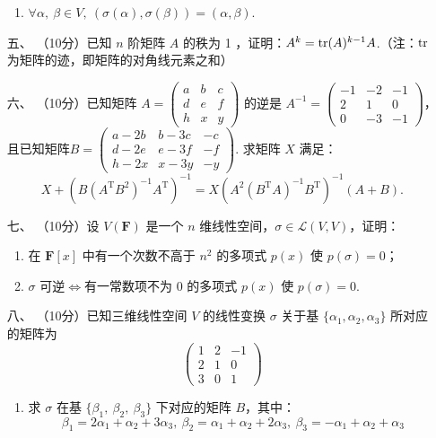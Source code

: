 \begin{enumerate}
\begin{enumerate}
        \item $\forall \alpha,\ \beta \in V,\ \left(\sigma (\alpha),\sigma (\beta) \right)=\left(\alpha,\beta\right)$.
    \end{enumerate}
	\item[五、]（10分）已知 $n$ 阶矩阵 $A$ 的秩为 1 ，证明：$A^k=\textup{tr}(A)^{k-1}A$.（注：$\textup{tr}$ 为矩阵的迹，即矩阵的对角线元素之和）
	\item[六、] （10分）已知矩阵 $A=\begin{pmatrix}a & b & c \\ d & e & f \\ h & x & y\end{pmatrix}$ 的逆是 $A^{-1}=\begin{pmatrix}-1 & -2 & -1 \\ 2 & 1 & 0 \\ 0 & -3 & -1\end{pmatrix}$，且已知矩阵$B=\begin{pmatrix}a-2b & b-3c & -c \\ d-2e & e-3f & -f \\ h-2x & x-3y & -y\end{pmatrix}$. 求矩阵 $X$ 满足：
    \[X+(B(A^\mathrm{T}B^2)^{-1}A^\mathrm{T})^{-1}=X(A^2(B^\mathrm{T}A)^{-1}B^\mathrm{T})^{-1}(A+B).\]
	\item[七、]（10分）设 $V(\mathbf{F})$ 是一个 $n$ 维线性空间，$\sigma \in \mathcal{L}(V,V)$，证明：
    \begin{enumerate}[label=(\arabic*)]
        \item 在 $\mathbf{F}[x]$ 中有一个次数不高于 $n^2$ 的多项式 $p(x)$ 使 $p(\sigma)=0$；

        \item $\sigma$ 可逆$\iff$有一常数项不为 0 的多项式 $p(x)$ 使 $p(\sigma)=0$.
    \end{enumerate}

\item[八、]（10分）已知三维线性空间 $V$ 的线性变换 $\sigma$ 关于基 $\{\alpha_1,\alpha_2,\alpha_3\}$ 所对应的矩阵为
    \[\begin{pmatrix}1 & 2 & -1 \\ 2 & 1 & 0 \\ 3 & 0 & 1\end{pmatrix}\]
    \begin{enumerate}[label=(\arabic*)]
        \item 求 $\sigma$ 在基 $\{\beta_1,\ \beta_2,\ \beta_3\}$ 下对应的矩阵 $B$，其中：
        \[\beta_1=2\alpha_1+\alpha_2+3\alpha_3,\ \beta_2=\alpha_1+\alpha_2+2\alpha_3,\ \beta_3=-\alpha_1+\alpha_2+\alpha_3\]


\end{enumerate}
\end{enumerate}
